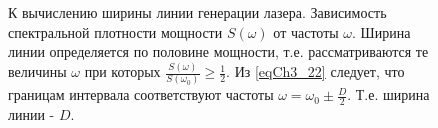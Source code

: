 \begin{figure}
\centering



\caption{К вычислению ширины линии генерации лазера. Зависимость
  спектральной плотности мощности $S\left(\omega\right)$ от частоты
  $\omega$. Ширина линии определяется по половине мощности, т.е.
  рассматриваются те величины $\omega$ при которых
  $\frac{S(\omega)}{S(\omega_0)} \ge \frac{1}{2}$.
  Из \eqref{eqCh3_22} следует, что границам интервала соответствуют
  частоты $\omega = \omega_0 \pm \frac{D}{2}$. Т.е. ширина линии - $D$.
}
\label{figPart2Ch1_8}
\end{figure}
